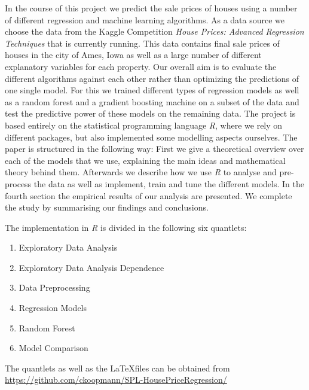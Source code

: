 In the course of this project we predict the sale prices of houses using a number of different regression and machine learning algorithms. As a data source we choose the data from the Kaggle Competition \textit{House Prices: Advanced Regression Techniques} that is currently running. This data contains final sale prices of houses in the city of Ames, Iowa as well as a large number of different explanatory variables for each property. Our overall aim is to evaluate the different algorithms against each other rather than optimizing the predictions of one single model. For this we trained different types of regression models as well as a random forest and a gradient boosting machine on a subset of the data and test the predictive power of these models on the remaining data. The project is based entirely on the statistical programming language \textit{R}, where we rely on different packages, but also implemented some modelling aspects ourselves. The paper is structured in the following way: First we give a theoretical overview over each of the models that we use, explaining the main ideas and mathematical theory behind them. Afterwards we describe how we use \textit{R} to  analyse and pre-process the data as well as implement, train and tune the different models. In the fourth section the empirical results of our analysis are presented. We complete the study by summarising our findings and conclusions. 


The implementation in \textit{R} is divided in the following six quantlets:
\begin{enumerate}
\item Exploratory Data Analysis
\item Exploratory Data Analysis Dependence
\item Data Preprocessing
\item Regression Models
\item Random Forest
\item Model Comparison
\end{enumerate}
The quantlets as well as the \LaTeX files can be obtained from \href{https://github.com/ckoopmann/SPL-HousePriceRegression/}{https://github.com/ckoopmann/SPL-HousePriceRegression/}
